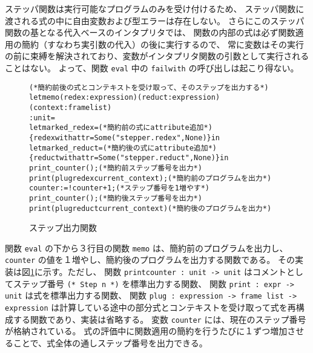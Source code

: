 ステッパ関数は実行可能なプログラムのみを受け付けるため、
ステッパ関数に渡される式の中に自由変数および型エラーは存在しない。
さらにこのステッパ関数の基となる代入ベースのインタプリタでは、
関数の内部の式は必ず関数適用の簡約（すなわち実引数の代入）の後に実行するので、
常に変数はその実行の前に束縛を解決されており、変数がインタプリタ関数の引数として実行されることはない。
よって、関数 \texttt{eval} 中の \texttt{failwith} の呼び出しは起こり得ない。

\begin{figure}[t]
\begin{spacing}{0.8}
\begin{alltt}
(* 簡約前後の式とコンテキストを受け取って、そのステップを出力する *)
let memo (redex : expression) (reduct : expression) (context : frame list)
  : unit =
  let marked_redex =                            (* 簡約前の式に attribute 追加 *)
    \{redex with attr = Some ("stepper.redex", None)\} in
  let marked_reduct =                           (* 簡約後の式に attribute 追加 *)
    \{reduct with attr = Some ("stepper.reduct", None)\} in
  print_counter ();                                 (* 簡約前ステップ番号を出力 *)
  print (plug redex current_context);               (* 簡約前のプログラムを出力 *)
  counter := !counter + 1;                          (* ステップ番号を 1 増やす *)
  print_counter ();                                 (* 簡約後ステップ番号を出力 *)
  print (plug reduct current_context)               (* 簡約後のプログラムを出力 *)
\end{alltt}
\end{spacing}
\caption{ステップ出力関数}
\label{figure:memo}
\end{figure}

関数 \texttt{eval} の下から３行目の関数 \texttt{memo} は、簡約前のプログラムを出力し、
\texttt{counter} の値を１増やし、簡約後のプログラムを出力する関数である。
その実装は図\ref{figure:memo}に示す。ただし、
関数 \texttt{print\US counter :\ unit -> unit} はコメントとしてステップ番号
\texttt{(* Step n *)} を標準出力する関数、
関数 \texttt{print :\ expr -> unit} は式を標準出力する関数、
関数 \texttt{plug :\ expression -> frame list -> expression}
は計算している途中の部分式とコンテキストを受け取って式を再構成する関数であり、実装は省略する。
変数 \texttt{counter} には、現在のステップ番号が格納されている。
式の評価中に関数適用の簡約を行うたびに１ずつ増加させることで、式全体の通しステップ番号を出力できる。
